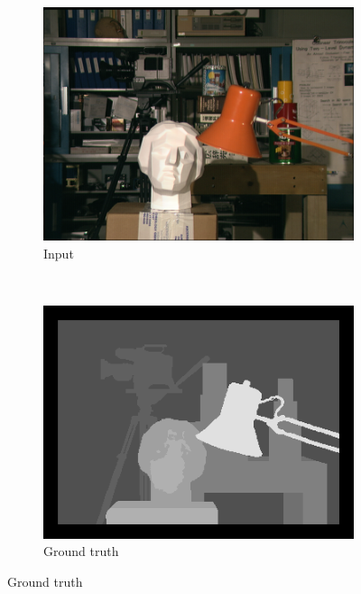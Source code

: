 \begin{figure}

  \setcounter{subfigure}{0}
  \label{fig:grid-of-outputs-tsukuba}
  \centering


  \begin{subfigure}[b]{0.45\textwidth}
    \centering
    \includegraphics[width=\textwidth]{images/stereo-pairs/tsukuba_imL.png}
    \caption{Input}
  \end{subfigure}
  ~
  \begin{subfigure}[b]{0.45\textwidth}
    \centering
    \includegraphics[width=\textwidth]{images/stereo-pairs/tsukuba_groundtruth.png}
    \caption{Ground truth}
  \end{subfigure}


\end{figure}

